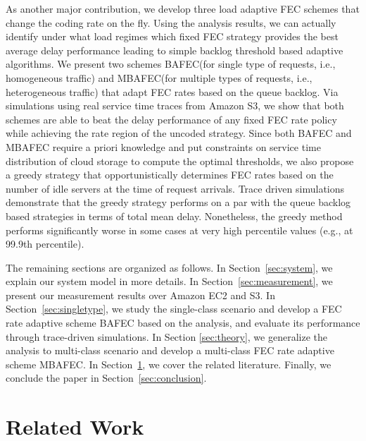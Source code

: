 \documentclass[journal]{IEEEtran}
\newcommand{\nonBlocking}{{BAFEC}\xspace}
\newcommand{\multiclass}{{MBAFEC}\xspace}
\begin{document}
As another major contribution, we develop three load adaptive FEC schemes that change the coding rate on the fly. Using the analysis results, we can actually identify under what load regimes which fixed FEC strategy provides the best average delay performance leading to simple backlog threshold based adaptive algorithms. We present two schemes \nonBlocking (for single type of requests, i.e., homogeneous traffic) and \multiclass (for multiple types of requests, i.e., heterogeneous traffic) that adapt FEC rates based on the queue backlog. Via simulations using real service time traces from Amazon S3, we show that both schemes are able to beat the delay performance of any fixed FEC rate policy while achieving the rate region of the uncoded strategy. Since both \nonBlocking and \multiclass require a priori knowledge and put constraints on service time distribution of cloud storage to compute the optimal thresholds, we also propose a greedy strategy that opportunistically determines FEC rates based on the number of idle servers at the time of request arrivals.  Trace driven simulations demonstrate that the greedy strategy performs on a par with the queue backlog based strategies in terms of total mean delay. Nonetheless, the greedy method performs significantly worse in some cases at very high percentile values (e.g., at 99.9th percentile).

The remaining sections are organized as follows. In Section~\ref{sec:system}, we explain our system model in more details. In Section~\ref{sec:measurement}, we present our measurement results over Amazon EC2 and S3. In Section~\ref{sec:singletype}, we study the single-class scenario and develop a  FEC rate adaptive scheme \nonBlocking based on the analysis, and evaluate its performance through trace-driven simulations. In Section \ref{sec:theory}, we generalize the analysis to multi-class scenario and develop a multi-class FEC rate adaptive scheme \multiclass.  
In Section~\ref{sec:related}, we cover the related literature. Finally, we conclude the paper in Section~\ref{sec:conclusion}.  



\section{Related Work}
\label{sec:related}
\end{document}
